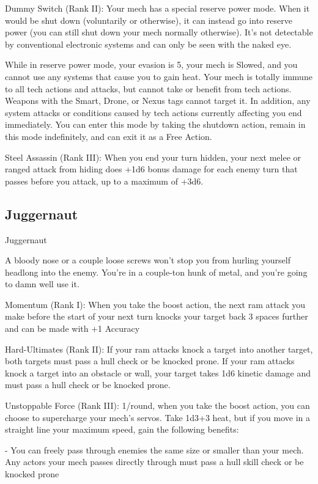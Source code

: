 Dummy Switch (Rank II): Your mech has a special reserve power mode. When it would be shut  
down (voluntarily or otherwise), it can instead go into reserve power (you can still shut down your  
mech normally otherwise). It’s not detectable by conventional electronic systems and can only be  
seen with the naked eye.
 
While in reserve power mode, your evasion is 5, your mech is Slowed, and you cannot use any  
systems that cause you to gain heat. Your mech is totally immune to all tech actions and attacks,  
but cannot take or benefit from tech actions. Weapons with the Smart, Drone, or Nexus tags  
cannot target it. In addition, any system attacks or conditions caused by tech actions currently  
affecting you end immediately. You can enter this mode by taking the shutdown action, remain in  
this mode indefinitely, and can exit it as a Free Action.
 
Steel Assassin (Rank III): When you end your turn hidden, your next melee or ranged attack  
from hiding does +1d6 bonus damage for each enemy turn that passes before you attack, up to  
a maximum of +3d6.
 
\subsection{Juggernaut}

                                                Juggernaut  

A bloody nose or a couple loose screws won’t stop you from hurling yourself headlong into the enemy.  
You’re in a couple-ton hunk of metal, and you’re going to damn well use it.  

Momentum (Rank I): When you take the boost action, the next ram attack you make before the  
start of your next turn knocks your target back 3 spaces further and can be made with +1  
Accuracy
 
Hard-Ultimates (Rank II): If your ram attacks knock a target into another target, both targets  
must pass a hull check or be knocked prone. If your ram attacks knock a target into an obstacle  
or wall, your target takes 1d6 kinetic damage and must pass a hull check or be knocked prone.
 
Unstoppable Force (Rank III): 1/round, when you take the boost action, you can choose to  
supercharge your mech’s servos. Take 1d3+3 heat, but if you move in a straight line your  
maximum speed, gain the following benefits:
 
             -    You can freely pass through enemies the same size or smaller than your mech.  
                 Any actors your mech passes directly through must pass a hull skill check or be  
                  knocked prone
 
